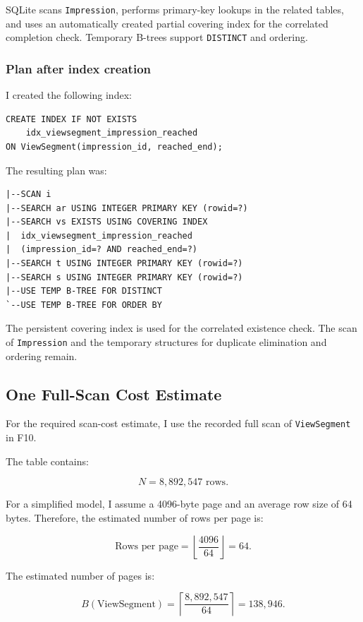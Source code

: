 \documentclass[11pt,a4paper]{article}
\begin{document}
SQLite scans \texttt{Impression}, performs primary-key lookups in
the related tables, and uses an automatically created partial
covering index for the correlated completion check. Temporary
B-trees support \texttt{DISTINCT} and ordering.

\subsubsection{Plan after index creation}

I created the following index:

\begin{lstlisting}[style=sqlstyle]
CREATE INDEX IF NOT EXISTS
    idx_viewsegment_impression_reached
ON ViewSegment(impression_id, reached_end);
\end{lstlisting}

The resulting plan was:

\begin{lstlisting}[style=textstyle]
|--SCAN i
|--SEARCH ar USING INTEGER PRIMARY KEY (rowid=?)
|--SEARCH vs EXISTS USING COVERING INDEX
|  idx_viewsegment_impression_reached
|  (impression_id=? AND reached_end=?)
|--SEARCH t USING INTEGER PRIMARY KEY (rowid=?)
|--SEARCH s USING INTEGER PRIMARY KEY (rowid=?)
|--USE TEMP B-TREE FOR DISTINCT
`--USE TEMP B-TREE FOR ORDER BY
\end{lstlisting}

The persistent covering index is used for the correlated existence
check. The scan of \texttt{Impression} and the temporary structures
for duplicate elimination and ordering remain.

\subsection{One Full-Scan Cost Estimate}

For the required scan-cost estimate, I use the recorded full scan
of \texttt{ViewSegment} in F10.

The table contains:

\[
N = 8{,}892{,}547 \text{ rows}.
\]

For a simplified model, I assume a 4096-byte page and an average
row size of 64 bytes. Therefore, the estimated number of rows per
page is:

\[
\text{Rows per page}
=
\left\lfloor \frac{4096}{64} \right\rfloor
=64.
\]

The estimated number of pages is:

\[
B(\text{ViewSegment})
=
\left\lceil \frac{8{,}892{,}547}{64} \right\rceil
=
138{,}946.
\]
\end{document}
